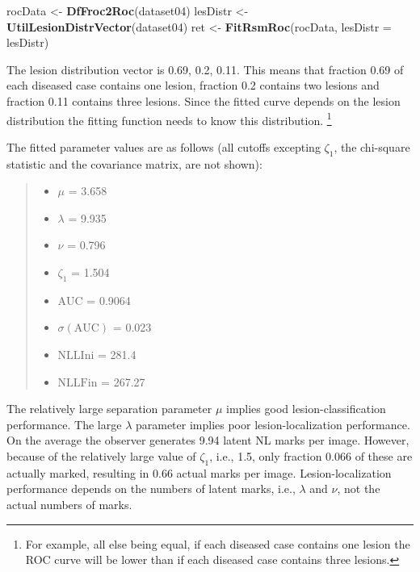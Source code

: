 \documentclass[
]{book}
\newenvironment{Shaded}{\begin{snugshade}}{\end{snugshade}}
\newcommand{\DataTypeTok}[1]{\textcolor[rgb]{0.13,0.29,0.53}{#1}}
\newcommand{\KeywordTok}[1]{\textcolor[rgb]{0.13,0.29,0.53}{\textbf{#1}}}
\newcommand{\NormalTok}[1]{#1}
\newcommand{\StringTok}[1]{\textcolor[rgb]{0.31,0.60,0.02}{#1}}
\providecommand{\tightlist}{%
  \setlength{\itemsep}{0pt}\setlength{\parskip}{0pt}}
\begin{document}
\begin{Shaded}
\begin{Highlighting}[]
\NormalTok{rocData <-}\StringTok{ }\KeywordTok{DfFroc2Roc}\NormalTok{(dataset04)}
\NormalTok{lesDistr <-}\StringTok{ }\KeywordTok{UtilLesionDistrVector}\NormalTok{(dataset04)}
\NormalTok{ret <-}\StringTok{ }\KeywordTok{FitRsmRoc}\NormalTok{(rocData, }\DataTypeTok{lesDistr =}\NormalTok{ lesDistr)}
\end{Highlighting}
\end{Shaded}

The lesion distribution vector is 0.69, 0.2, 0.11. This means that fraction 0.69 of each diseased case contains one lesion, fraction 0.2 contains two lesions and fraction 0.11 contains three lesions. Since the fitted curve depends on the lesion distribution the fitting function needs to know this distribution. \footnote{For example, all else being equal, if each diseased case contains one lesion the ROC curve will be lower than if each diseased case contains three lesions.}

The fitted parameter values are as follows (all cutoffs excepting \(\zeta_1\), the chi-square statistic and the covariance matrix, are not shown):

\begin{quote}
\begin{itemize}
\tightlist
\item
  \(\mu\) = 3.658
\item
  \(\lambda\) = 9.935
\item
  \(\nu\) = 0.796
\item
  \(\zeta_1\) = 1.504
\item
  \(\text{AUC}\) = 0.9064
\item
  \(\sigma (\text{AUC})\) = 0.023
\item
  \(\text{NLLIni}\) = 281.4
\item
  \(\text{NLLFin}\) = 267.27
\end{itemize}
\end{quote}

The relatively large separation parameter \(\mu\) implies good lesion-classification performance. The large \(\lambda\) parameter implies poor lesion-localization performance. On the average the observer generates 9.94 latent NL marks per image. However, because of the relatively large value of \(\zeta_1\), i.e., 1.5, only fraction 0.066 of these are actually marked, resulting in 0.66 actual marks per image. Lesion-localization performance depends on the numbers of latent marks, i.e., \(\lambda\) and \(\nu\), not the actual numbers of marks.
\end{document}
